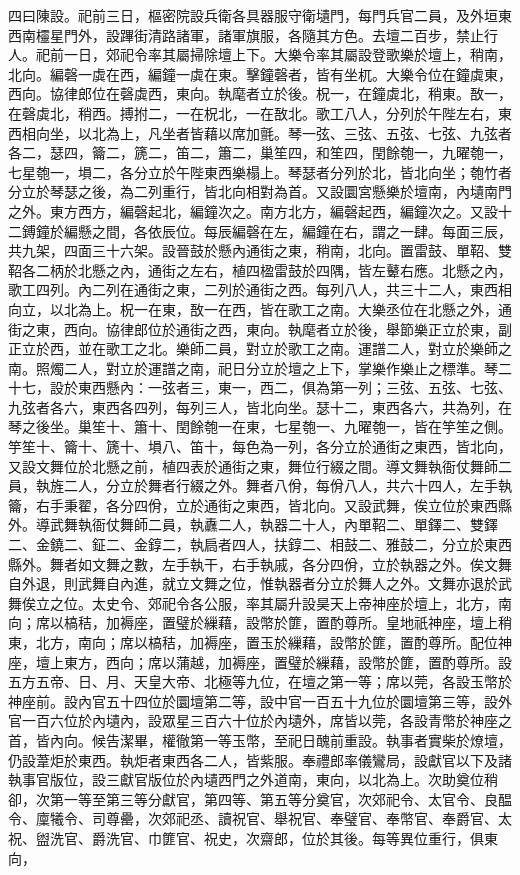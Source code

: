 \begin{pinyinscope}
 四曰陳設。祀前三日，樞密院設兵衛各具器服守衛壝門，每門兵官二員，及外垣東西南欞星門外，設蹕街清路諸軍，諸軍旗服，各隨其方色。去壇二百步，禁止行人。祀前一日，郊祀令率其屬掃除壇上下。大樂令率其屬設登歌樂於壇上，稍南，北向。編磬一虡在西，編鐘一虡在東。擊鐘磬者，皆有坐杌。大樂令位在鐘虡東，西向。協律郎位在磬虡西，東向。執麾者立於後。柷一，在鐘虡北，稍東。敔一，在磬虡北，稍西。搏拊二，一在柷北，一在敔北。歌工八人，分列於午陛左右，東西相向坐，以北為上，凡坐者皆藉以席加氈。琴一弦、三弦、五弦、七弦、九弦者各二，瑟四，籥二，篪二，笛二，簫二，巢笙四，和笙四，閏餘匏一，九曜匏一，七星匏一，塤二，各分立於午陛東西樂榻上。琴瑟者分列於北，皆北向坐；匏竹者分立於琴瑟之後，為二列重行，皆北向相對為首。又設圜宮懸樂於壇南，內壝南門之外。東方西方，編磬起北，編鐘次之。南方北方，編磬起西，編鐘次之。又設十二鎛鐘於編懸之間，各依辰位。每辰編磬在左，編鐘在右，謂之一肆。每面三辰，共九架，四面三十六架。設晉鼓於懸內通街之東，稍南，北向。置雷鼓、單鞀、雙鞀各二柄於北懸之內，通街之左右，植四楹雷鼓於四隅，皆左鼙右應。北懸之內，歌工四列。內二列在通街之東，二列於通街之西。每列八人，共三十二人，東西相向立，以北為上。柷一在東，敔一在西，皆在歌工之南。大樂丞位在北懸之外，通街之東，西向。協律郎位於通街之西，東向。執麾者立於後，舉節樂正立於東，副正立於西，並在歌工之北。樂師二員，對立於歌工之南。運譜二人，對立於樂師之南。照燭二人，對立於運譜之南，祀日分立於壇之上下，掌樂作樂止之標準。琴二十七，設於東西懸內：一弦者三，東一，西二，俱為第一列；三弦、五弦、七弦、九弦者各六，東西各四列，每列三人，皆北向坐。瑟十二，東西各六，共為列，在琴之後坐。巢笙十、簫十、閏餘匏一在東，七星匏一、九曜匏一，皆在竽笙之側。竽笙十、籥十、篪十、塤八、笛十，每色為一列，各分立於通街之東西，皆北向，又設文舞位於北懸之前，植四表於通街之東，舞位行綴之間。導文舞執衙仗舞師二員，執旌二人，分立於舞者行綴之外。舞者八佾，每佾八人，共六十四人，左手執籥，右手秉翟，各分四佾，立於通街之東西，皆北向。又設武舞，俟立位於東西縣外。導武舞執衙仗舞師二員，執纛二人，執器二十人，內單鞀二、單鐸二、雙鐸二、金鐃二、鉦二、金錞二，執扃者四人，扶錞二、相鼓二、雅鼓二，分立於東西縣外。舞者如文舞之數，左手執干，右手執戚，各分四佾，立於執器之外。俟文舞自外退，則武舞自內進，就立文舞之位，惟執器者分立於舞人之外。文舞亦退於武舞俟立之位。太史令、郊祀令各公服，率其屬升設昊天上帝神座於壇上，北方，南向；席以槁秸，加褥座，置璧於繅藉，設幣於篚，置酌尊所。皇地祇神座，壇上稍東，北方，南向；席以槁秸，加褥座，置玉於繅藉，設幣於篚，置酌尊所。配位神座，壇上東方，西向；席以蒲越，加褥座，置璧於繅藉，設幣於篚，置酌尊所。設五方五帝、日、月、天皇大帝、北極等九位，在壇之第一等；席以莞，各設玉幣於神座前。設內官五十四位於圜壇第二等，設中官一百五十九位於圜壇第三等，設外官一百六位於內壝內，設眾星三百六十位於內壝外，席皆以莞，各設青幣於神座之首，皆內向。候告潔畢，權徹第一等玉幣，至祀日醜前重設。執事者實柴於燎壇，仍設葦炬於東西。執炬者東西各二人，皆紫服。奉禮郎率儀鸞局，設獻官以下及諸執事官版位，設三獻官版位於內壝西門之外道南，東向，以北為上。次助奠位稍卻，次第一等至第三等分獻官，第四等、第五等分奠官，次郊祀令、太官令、良醖令、廩犧令、司尊罍，次郊祀丞、讀祝官、舉祝官、奉璧官、奉幣官、奉爵官、太祝、盥洗官、爵洗官、巾篚官、祝史，次齋郎，位於其後。每等異位重行，俱東向，
\end{pinyinscope}
